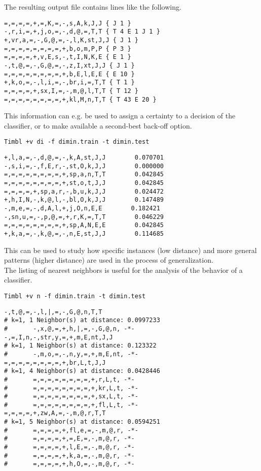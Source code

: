 \documentclass{report}
\begin{document}
The resulting output file contains lines like the following.

{\small
\begin{verbatim}
=,=,=,=,+,=,K,=,-,s,A,k,J,J { J 1 }
-,r,i,=,+,j,o,=,-,d,@,=,T,T { T 4 E 1 J 1 }
+,vr,a,=,-,G,@,=,-,l,K,st,J,J { J 1 }
=,=,=,=,=,=,=,=,+,b,o,m,P,P { P 3 }
=,=,=,=,+,v,E,s,-,t,I,N,K,E { E 1 }
-,t,@,=,-,G,@,=,-,z,I,xt,J,J { J 1 }
=,=,=,=,=,=,=,=,+,b,E,l,E,E { E 10 }
+,k,o,=,-,l,i,=,-,br,i,=,T,T { T 1 }
=,=,=,=,+,sx,I,=,-,m,@,l,T,T { T 12 }
=,=,=,=,=,=,=,=,+,kl,M,n,T,T { T 43 E 20 }
\end{verbatim}
}

This information can e.g. be used to assign a certainty to a decision
of the classifier, or to make available a second-best back-off option.

{\small
\begin{verbatim}
Timbl +v di -f dimin.train -t dimin.test
\end{verbatim}
}

{\small
\begin{verbatim}
+,l,a,=,-,d,@,=,-,k,A,st,J,J        0.070701
-,s,i,=,-,f,E,r,-,st,O,k,J,J        0.000000
=,=,=,=,=,=,=,=,+,sp,a,n,T,T        0.042845
=,=,=,=,=,=,=,=,+,st,o,t,J,J        0.042845
=,=,=,=,+,sp,a,r,-,b,u,k,J,J        0.024472
+,h,I,N,-,k,@,l,-,bl,O,k,J,J        0.147489
-,m,e,=,-,d,A,l,+,j,O,n,E,E        0.182421
-,sn,u,=,-,p,@,=,+,r,K,=,T,T        0.046229
=,=,=,=,=,=,=,=,+,sp,A,N,E,E        0.042845
+,k,a,=,-,k,@,=,-,n,E,st,J,J        0.114685        
\end{verbatim}
}

This can be used to study how specific instances (low distance) and
more general patterns (higher distance) are used in the process of
generalization.\\

The listing of nearest neighbors is useful for the analysis of the
behavior of a classifier.

{\small
\begin{verbatim}
Timbl +v n -f dimin.train -t dimin.test
\end{verbatim}
}

{\small
\begin{verbatim}
-,t,@,=,-,l,|,=,-,G,@,n,T,T
# k=1, 1 Neighbor(s) at distance: 0.0997233
#       -,x,@,=,+,h,|,=,-,G,@,n, -*-
-,=,I,n,-,str,y,=,+,m,E,nt,J,J
# k=1, 1 Neighbor(s) at distance: 0.123322
#       -,m,o,=,-,n,y,=,+,m,E,nt, -*-
=,=,=,=,=,=,=,=,+,br,L,t,J,J
# k=1, 4 Neighbor(s) at distance: 0.0428446
#       =,=,=,=,=,=,=,=,+,r,L,t, -*-
#       =,=,=,=,=,=,=,=,+,kr,L,t, -*-
#       =,=,=,=,=,=,=,=,+,sx,L,t, -*-
#       =,=,=,=,=,=,=,=,+,fl,L,t, -*-
=,=,=,=,+,zw,A,=,-,m,@,r,T,T
# k=1, 5 Neighbor(s) at distance: 0.0594251
#       =,=,=,=,+,fl,e,=,-,m,@,r, -*-
#       =,=,=,=,+,=,E,=,-,m,@,r, -*-
#       =,=,=,=,+,l,E,=,-,m,@,r, -*-
#       =,=,=,=,+,k,a,=,-,m,@,r, -*-
#       =,=,=,=,+,h,O,=,-,m,@,r, -*-                    
\end{verbatim}
}
\end{document}
